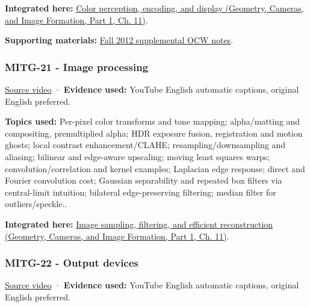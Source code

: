 \textbf{Integrated here:} \href{../03-Geometry-Cameras-and-Image-Formation-P01/main.pdf\#nameddest=03-visual-computing-i-ch004-color-perception-encoding-and-display}{Color perception, encoding, and display (Geometry, Cameras, and Image Formation, Part 1, Ch. 11)}.

\textbf{Supporting materials:} \href{https://ocw.mit.edu/courses/6-837-computer-graphics-fall-2012/pages/lecture-notes/}{Fall 2012 supplemental OCW notes}.

\subsubsection{MITG-21 - Image processing}\label{04-visual-computing-ii-ch036-mitg-21---image-processing}

\hypertarget{04-visual-computing-ii-ch036-mitg-21---image-processing}{}

\href{https://www.youtube.com/watch?v=WWLxaVzkneI}{Source video} · \textbf{Evidence used:} YouTube English automatic captions, original English preferred.

\textbf{Topics used:} Per-pixel color transforms and tone mapping; alpha/matting and compositing, premultiplied alpha; HDR exposure fusion, registration and motion ghosts; local contrast enhancement/CLAHE; resampling/downsampling and aliasing; bilinear and edge-aware upscaling; moving least squares warps; convolution/correlation and kernel examples; Laplacian edge response; direct and Fourier convolution cost; Gaussian separability and repeated box filters via central-limit intuition; bilateral edge-preserving filtering; median filter for outliers/speckle..

\textbf{Integrated here:} \href{../03-Geometry-Cameras-and-Image-Formation-P01/main.pdf\#nameddest=03-visual-computing-i-ch004-image-sampling-filtering-and-efficient-reconstruction}{Image sampling, filtering, and efficient reconstruction (Geometry, Cameras, and Image Formation, Part 1, Ch. 11)}.

\subsubsection{MITG-22 - Output devices}\label{04-visual-computing-ii-ch036-mitg-22---output-devices}

\hypertarget{04-visual-computing-ii-ch036-mitg-22---output-devices}{}

\href{https://www.youtube.com/watch?v=Z5693mG_iCE}{Source video} · \textbf{Evidence used:} YouTube English automatic captions, original English preferred.

